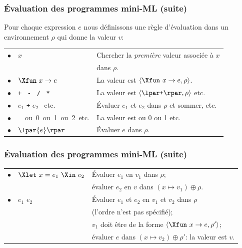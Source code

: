 %
\begin{frame}
\frametitle{Évaluation des programmes mini-ML (suite)}

Pour chaque expression $e$ nous définissons une règle d'évaluation
dans un environnement $\rho$ qui donne la valeur $v$:

\begin{tabular}{rll}
    $\bullet$
  & $x$
  & Chercher la \emph{première} valeur associée à $x$\\
 && dans $\rho$.\\
    $\bullet$
  & $\Xfun \,\, x \rightarrow e$
  & La valeur est $\langle\Xfun \,\, x \rightarrow e, \rho\rangle$.\\
    $\bullet$
  & \texttt{+} \ \texttt{-} \ \texttt{/} \ \texttt{*}
  & La valeur est $\langle\lpar\texttt{+}\rpar, \rho\rangle$ etc.\\
    $\bullet$
  & $e_1$ \texttt{+} $e_2$ \ etc.
  & Évaluer $e_1$ et $e_2$ dans $\rho$ et sommer, etc.\\
    $\bullet$
  & \unit \ ou \textsf{0} ou \textsf{1} ou \textsf{2} etc.
  & La valeur est \unit{} ou \textsf{0} ou \textsf{1} etc.\\
    $\bullet$
  & $\lpar{e}\rpar$
  & Évaluer $e$ dans $\rho$.
\end{tabular}

\end{frame}

%
\begin{frame}
\frametitle{Évaluation des programmes mini-ML (suite)}
\label{semantique_let_in}

\begin{tabular}{rll}
    $\bullet$
  & $\Xlet \,\, x = e_1 \,\, \Xin \,\, e_2$
  & Évaluer $e_1$ en $v_1$ dans $\rho$;\\
  &
  & évaluer $e_2$ en $v$ dans $(x \mapsto v_1) \oplus \rho$.\\
    $\bullet$
  & $e_1 \,\, e_2$
  & Évaluer $e_1$ et $e_2$ en $v_1$ et $v_2$ dans $\rho$\\
  &
  & (l'ordre n'est pas spécifié);\\
  &
  & $v_1$ doit être de la forme $\langle\Xfun \,\, x \rightarrow
    e,\rho'\rangle$;\\
  &
  & évaluer $e$ dans $(x \mapsto v_2) \oplus \rho'$: la valeur est $v$.
\end{tabular}

\end{frame}

